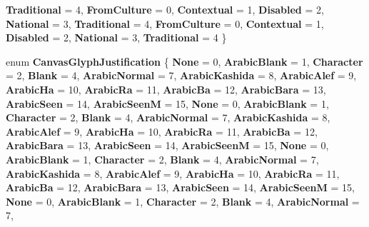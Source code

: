 \begin{DoxyCompactItemize}
{\bfseries Traditional} = 4, 
{\bfseries From\+Culture} = 0, 
\newline
{\bfseries Contextual} = 1, 
{\bfseries Disabled} = 2, 
{\bfseries National} = 3, 
{\bfseries Traditional} = 4, 
\newline
{\bfseries From\+Culture} = 0, 
{\bfseries Contextual} = 1, 
{\bfseries Disabled} = 2, 
{\bfseries National} = 3, 
\newline
{\bfseries Traditional} = 4
 \}
\item 
\mbox{\label{namespace_microsoft_1_1_graphics_1_1_canvas_1_1_text_acba5660b438dcb959c71962388688034}} 
enum {\bfseries Canvas\+Glyph\+Justification} \{ \newline
{\bfseries None} = 0, 
{\bfseries Arabic\+Blank} = 1, 
{\bfseries Character} = 2, 
{\bfseries Blank} = 4, 
\newline
{\bfseries Arabic\+Normal} = 7, 
{\bfseries Arabic\+Kashida} = 8, 
{\bfseries Arabic\+Alef} = 9, 
{\bfseries Arabic\+Ha} = 10, 
\newline
{\bfseries Arabic\+Ra} = 11, 
{\bfseries Arabic\+Ba} = 12, 
{\bfseries Arabic\+Bara} = 13, 
{\bfseries Arabic\+Seen} = 14, 
\newline
{\bfseries Arabic\+SeenM} = 15, 
{\bfseries None} = 0, 
{\bfseries Arabic\+Blank} = 1, 
{\bfseries Character} = 2, 
\newline
{\bfseries Blank} = 4, 
{\bfseries Arabic\+Normal} = 7, 
{\bfseries Arabic\+Kashida} = 8, 
{\bfseries Arabic\+Alef} = 9, 
\newline
{\bfseries Arabic\+Ha} = 10, 
{\bfseries Arabic\+Ra} = 11, 
{\bfseries Arabic\+Ba} = 12, 
{\bfseries Arabic\+Bara} = 13, 
\newline
{\bfseries Arabic\+Seen} = 14, 
{\bfseries Arabic\+SeenM} = 15, 
{\bfseries None} = 0, 
{\bfseries Arabic\+Blank} = 1, 
\newline
{\bfseries Character} = 2, 
{\bfseries Blank} = 4, 
{\bfseries Arabic\+Normal} = 7, 
{\bfseries Arabic\+Kashida} = 8, 
\newline
{\bfseries Arabic\+Alef} = 9, 
{\bfseries Arabic\+Ha} = 10, 
{\bfseries Arabic\+Ra} = 11, 
{\bfseries Arabic\+Ba} = 12, 
\newline
{\bfseries Arabic\+Bara} = 13, 
{\bfseries Arabic\+Seen} = 14, 
{\bfseries Arabic\+SeenM} = 15, 
{\bfseries None} = 0, 
\newline
{\bfseries Arabic\+Blank} = 1, 
{\bfseries Character} = 2, 
{\bfseries Blank} = 4, 
{\bfseries Arabic\+Normal} = 7, 

\end{DoxyCompactItemize}
